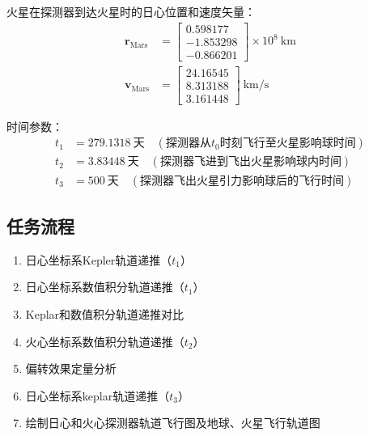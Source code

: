 \documentclass[12pt,a4paper]{article}
\begin{document}
火星在探测器到达火星时的日心位置和速度矢量：
\begin{equation*}
    \begin{aligned}
        \mathbf{r}_{\text{Mars}} &=
        \begin{bmatrix}
            0.598177 \\ 
            -1.853298 \\ 
            -0.866201
        \end{bmatrix}
        \times 10^8
        \ \mathrm{km} \\
        \mathbf{v}_{\text{Mars}} &= 
        \begin{bmatrix}
            24.16545 \\ 
            8.313188 \\ 
            3.161448
        \end{bmatrix}\ \mathrm{km/s}
    \end{aligned}
\end{equation*}

时间参数：
\begin{equation*}
    \begin{aligned}
        t_1 &= 279.1318\ \text{天} \quad (\text{探测器从$t_0$时刻飞行至火星影响球时间}) \\        
        t_2 &= 3.83448\ \text{天} \quad (\text{探测器飞进到飞出火星影响球内时间}) \\
        t_3 &= 500\ \text{天} \quad (\text{探测器飞出火星引力影响球后的飞行时间})
    \end{aligned}
\end{equation*}

\subsection{任务流程}
\begin{enumerate}
    \item 日心坐标系Kepler轨道递推（$t_1$）
    \item 日心坐标系数值积分轨道递推（$t_1$）
    \item Keplar和数值积分轨道递推对比
    \item 火心坐标系数值积分轨道递推（$t_2$）
    \item 偏转效果定量分析
    \item 日心坐标系keplar轨道递推（$t_3$）
    \item 绘制日心和火心探测器轨道飞行图及地球、火星飞行轨道图
\end{enumerate}
\end{document}
